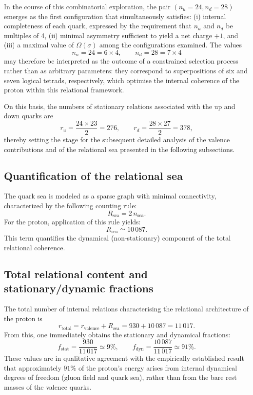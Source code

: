 \documentclass[11pt,a4paper]{article}
\begin{document}
In the course of this combinatorial exploration, the pair \((n_u = 24, n_d = 28)\) emerges as the first configuration that simultaneously satisfies: (i) internal completeness of each quark, expressed by the requirement that \(n_u\) and \(n_d\) be multiples of 4, (ii) minimal asymmetry sufficient to yield a net charge \(+1\), and (iii) a maximal value of \(\Omega(\sigma)\) among the configurations examined. The values
\[
n_u = 24 = 6 \times 4, \qquad n_d = 28 = 7 \times 4
\]
may therefore be interpreted as the outcome of a constrained selection process rather than as arbitrary parameters: they correspond to superpositions of six and seven logical tetrads, respectively, which optimise the internal coherence of the proton within this relational framework.

On this basis, the numbers of stationary relations associated with the up and down quarks are
\[
r_u = \frac{24 \times 23}{2} = 276, \qquad
r_d = \frac{28 \times 27}{2} = 378,
\]
thereby setting the stage for the subsequent detailed analysis of the valence contributions and of the relational sea presented in the following subsections.

\subsection{Quantification of the relational sea}
The quark sea is modeled as a sparse graph with minimal connectivity, characterized by the following counting rule:
\[
R_{\mathrm{sea}} = 2\, n_{\mathrm{sea}}.
\]
For the proton, application of this rule yields:
\[
R_{\mathrm{sea}} \simeq 10\,087.
\]
This term quantifies the dynamical (non‑stationary) component of the total relational coherence.

\subsection{Total relational content and stationary/dynamic fractions}

The total number of internal relations characterising the relational architecture of the proton is
\[
r_{\mathrm{total}} = r_{\mathrm{valence}} + R_{\mathrm{sea}}
= 930 + 10\,087
= 11\,017.
\]
From this, one immediately obtains the stationary and dynamical fractions:
\[
f_{\mathrm{stat}} = \frac{930}{11\,017} \simeq 9\%, \qquad
f_{\mathrm{dyn}}  = \frac{10\,087}{11\,017} \simeq 91\%.
\]
These values are in qualitative agreement with the empirically established result that approximately \(91\%\) of the proton’s energy arises from internal dynamical degrees of freedom (gluon field and quark sea), rather than from the bare rest masses of the valence quarks. 
\end{document}
